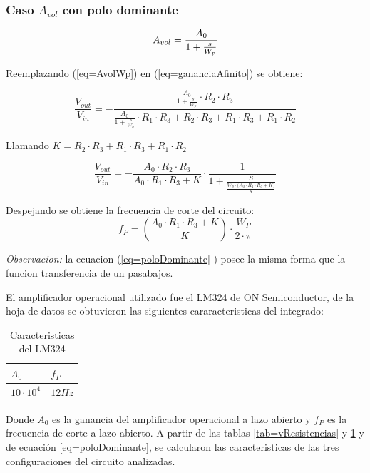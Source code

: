 \documentclass[../../main.tex]{subfiles}
\begin{document}
\subsubsection{Caso $A_{vol}$  con polo dominante}

\begin{equation}
A_{vol }=\frac{A_{0}}{1+\frac{s}{W_{p}}}\label{eq=AvolWp}\\
\end{equation} 

Reemplazando \big(\ref{eq=AvolWp}\big) en  \big(\ref{eq=gananciaAfinito}\big)  se obtiene:

\begin{equation}
\frac{V_{out}}{V_{in}}= - \frac{\frac{A_{0}}{1+\frac{s}{W_{p}}} \cdot R_{2} \cdot R_{3}}{\frac{A_{0}}{1+\frac{s}{W_{p}}}\cdot R_{1} \cdot R_{3} + R_{2} \cdot R_{3} +  R_{1} \cdot R_{3} + R_{1} \cdot R_{2} }
\end{equation}

Llamando $K= R_{2} \cdot R_{3} +  R_{1} \cdot R_{3} + R_{1} \cdot R_{2}$


\begin{equation}
\frac{V_{out}}{V_{in}}=- \frac{A_{0} \cdot  R_{2} \cdot  R_{3} }{A_{0} \cdot R_{1} \cdot  R_{3} + K }  \cdot \frac{1}{1 +\frac {S}{\frac{W_{p}  \cdot \big( A_{0} \cdot R_{1} \cdot R_{3} + K \big) }{K}}} \label{eq=poloDominante}
\end{equation}

 Despejando se obtiene la frecuencia de corte del circuito:
\begin{equation}
f_{P}=\left( \frac {A_{0} \cdot R_{1} \cdot R_{3} + K}{K}\right)  \cdot \frac{W_{P}}{2\cdot \pi}  \label{eq=fCorte}
\end{equation}

\textit{Observacion:}  la ecuacion \big(\ref{eq=poloDominante} \big) posee la misma forma que la funcion transferencia de un pasabajos.



El amplificador operacional utilizado fue el LM324 de ON Semiconductor, de la hoja de datos se obtuvieron las siguientes cararacteristicas del integrado:


\begin{table}[h]
\begin{center}
\begin{tabular}{|l|l|}
\hline
$A_{0}$ & $f_{P}$ \\
\hline \hline
$10\cdot 10^{4}$& $ 12Hz $ \\ \hline

\end{tabular}
\caption{Caracteristicas del LM324} 
\label{tab=lm324Carac}
\end{center}
\end{table}
Donde $A_{0}$ es la ganancia del amplificador operacional a lazo abierto y  $f_{P}$ es la frecuencia de corte a lazo abierto. A partir de las tablas \ref{tab=vResistencias} y \ref{tab=lm324Carac} y de ecuación  \ref{eq=poloDominante}, se calcularon las caracteristicas de las tres configuraciones del circuito analizadas.
\end{document}
